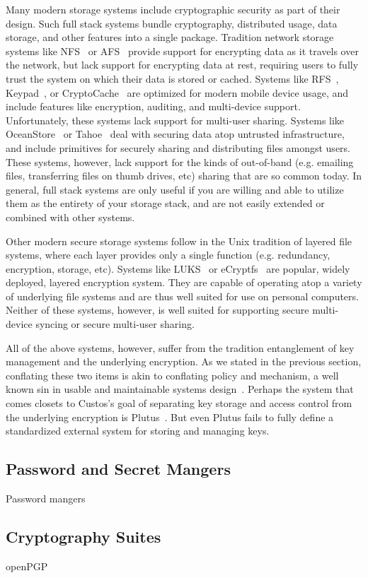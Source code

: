 Many modern storage systems include cryptographic security as part of
their design. Such full stack systems bundle cryptography, distributed
usage, data storage, and other features into a single
package. Tradition network storage systems like
NFS~\cite{Sandberg1985} or AFS~\cite{Howard1988} provide support for
encrypting data as it travels over the network, but lack support for
encrypting data at rest, requiring users to fully trust the system on
which their data is stored or cached. Systems like
RFS~\cite{Dong2011}, Keypad~\cite{Geambasu2011}, or
CryptoCache~\cite{Jensen2000} are optimized for modern mobile device
usage, and include features like encryption, auditing, and
multi-device support. Unfortunately, these systems lack support for
multi-user sharing. Systems like OceanStore~\cite{Kubiatowicz2000} or
Tahoe~\cite{Wilcox-O'Hearn2008} deal with securing data atop untrusted
infrastructure, and include primitives for securely sharing and
distributing files amongst users. These systems, however, lack support
for the kinds of out-of-band (e.g. emailing files, transferring files
on thumb drives, etc) sharing that are so common today. In general,
full stack systems are only useful if you are willing and able to
utilize them as the entirety of your storage stack, and are not easily
extended or combined with other systems.

Other modern secure storage systems follow in the Unix tradition of
layered file systems, where each layer provides only a single function
(e.g. redundancy, encryption, storage, etc). Systems like
LUKS~\cite{luks} or eCryptfs~\cite{eCryptfs, Halcrow} are popular,
widely deployed, layered encryption system. They are capable of
operating atop a variety of underlying file systems and are thus well
suited for use on personal computers. Neither of these systems,
however, is well suited for supporting secure multi-device syncing or
secure multi-user sharing.

All of the above systems, however, suffer from the tradition
entanglement of key management and the underlying encryption. As we
stated in the previous section, conflating these two items is akin to
conflating policy and mechanism, a well known sin in usable and
maintainable systems design~\cite{Wulf1974}. Perhaps the system that
comes closets to Custos's goal of separating key storage and access
control from the underlying encryption is
Plutus~\cite{Kallahalla2003}. But even Plutus fails to fully define a
standardized external system for storing and managing keys.

\subsection{Password and Secret Mangers}

Password mangers

\subsection{Cryptography Suites}

openPGP

